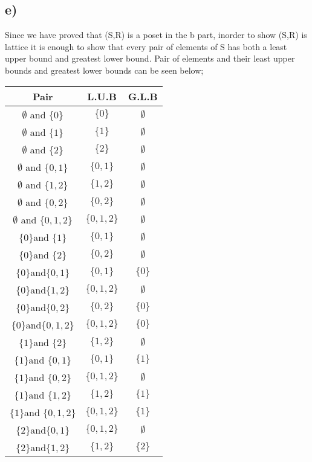 \documentclass[11pt]{article}
\begin{document}
\subsection*{e)}
Since we have proved that (S,R) is a poset in the b part, inorder to show (S,R) is lattice it is enough to show that every pair of elements of S has both a least upper bound and greatest lower bound. Pair of elements and their least upper bounds and greatest lower bounds can be seen below;\\
\begin{table}[H]
	\centering
	\vspace{5px}
	\begin{tabular}{|c|c|c|}
		\hline
		Pair&L.U.B&G.L.B\\ \hline
		$\emptyset$ and $\{0\}$&$\{0\}$&$\emptyset$\\ \hline
		$\emptyset$ and $\{1\}$&$\{1\}$&$\emptyset$\\ \hline
		$\emptyset$ and $\{2\}$&$\{2\}$&$\emptyset$\\ \hline
		$\emptyset$ and $\{0,1\}$&$\{0,1\}$&$\emptyset$\\ \hline
		$\emptyset$ and $\{1,2\}$&$\{1,2\}$&$\emptyset$\\ \hline
		$\emptyset$ and $\{0,2\}$&$\{0,2\}$&$\emptyset$\\ \hline
		$\emptyset$ and $\{0,1,2\}$&$\{0,1,2\}$&$\emptyset$\\ \hline
		$\{0\}$and $\{1\}$&$\{0,1\}$&$\emptyset$\\ \hline
		$\{0\}$and $\{2\}$&$\{0,2\}$&$\emptyset$\\ \hline
		$\{0\}$and$\{0,1\}$&$\{0,1\}$&$\{0\}$\\ \hline
		$\{0\}$and$\{1,2\}$&$\{0,1,2\}$&$\emptyset$\\ \hline
		$\{0\}$and$\{0,2\}$&$\{0,2\}$&$\{0\}$\\ \hline
		$\{0\}$and$\{0,1,2\}$&$\{0,1,2\}$&$\{0\}$\\ \hline
		$\{1\}$and $\{2\}$&$\{1,2\}$&$\emptyset$\\ \hline
		$\{1\}$and $\{0,1\}$&$\{0,1\}$&$\{1\}$\\ \hline
		$\{1\}$and $\{0,2\}$&$\{0,1,2\}$&$\emptyset$\\ \hline
		$\{1\}$and $\{1,2\}$&$\{1,2\}$&$\{1\}$\\ \hline
		$\{1\}$and $\{0,1,2\}$&$\{0,1,2\}$&$\{1\}$\\ \hline
		$\{2\}$and$\{0,1\}$&$\{0,1,2\}$&$\emptyset$\\ \hline
		$\{2\}$and$\{1,2\}$&$\{1,2\}$&$\{2\}$\\ \hline

\end{tabular}
\end{table}
\end{document}
